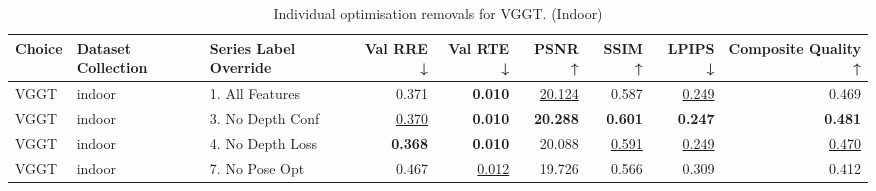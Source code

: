 \begin{table}[H]
\caption{\ifdefined\customcaption \customcaption \else Individual optimisation removals for VGGT. (Indoor) \fi}
\label{tab:99_all_improvements_removals_vggt_indoor}
\centering
\scriptsize
\begin{tabular}{lllrrrrrr}
\toprule
Choice & Dataset Collection & Series Label Override & Val RRE ↓ & Val RTE ↓ & PSNR ↑ & SSIM ↑ & LPIPS ↓ & Composite Quality ↑ \\
\midrule
VGGT & indoor & 1. All Features & 0.371 & \textbf{0.010} & \underline{20.124} & 0.587 & \underline{0.249} & 0.469 \\
VGGT & indoor & 3. No Depth Conf & \underline{0.370} & \textbf{0.010} & \textbf{20.288} & \textbf{0.601} & \textbf{0.247} & \textbf{0.481} \\
VGGT & indoor & 4. No Depth Loss & \textbf{0.368} & \textbf{0.010} & 20.088 & \underline{0.591} & \underline{0.249} & \underline{0.470} \\
VGGT & indoor & 7. No Pose Opt & 0.467 & \underline{0.012} & 19.726 & 0.566 & 0.309 & 0.412 \\
\bottomrule
\end{tabular}
\end{table}